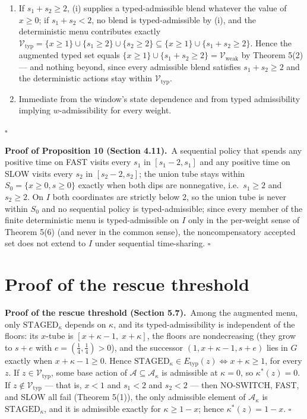 \documentclass[3p,11pt]{elsarticle}
\begin{document}
\begin{enumerate}
\def\labelenumi{(\roman{enumi})}
\setcounter{enumi}{1}
\item
  If \(s_1 + s_2 \ge 2\), (i) supplies a typed-admissible blend whatever
  the value of \(x \ge 0\); if \(s_1 + s_2 < 2\), no blend is
  typed-admissible by (i), and the deterministic menu contributes
  exactly
  \(\mathcal{V}_{\mathrm{typ}} = \{x \ge 1\} \cup \{s_1 \ge 2\} \cup \{s_2 \ge 2\} \subseteq \{x \ge 1\} \cup \{s_1 + s_2 \ge 2\}\).
  Hence the augmented typed set equals
  \(\{x \ge 1\} \cup \{s_1 + s_2 \ge 2\} = \mathcal{V}_{\mathrm{weak}}\)
  by Theorem 5(2) --- and nothing beyond, since every admissible blend
  satisfies \(s_1 + s_2 \ge 2\) and the deterministic actions stay
  within \(\mathcal{V}_{\mathrm{typ}}\).
\item
  Immediate from the window's state dependence and from typed
  admissibility implying \(w\)-admissibility for every weight.
\end{enumerate}

\ensuremath{\square}

\textbf{Proof of Proposition 10 (Section 4.11).}\ A sequential policy that spends any positive time on FAST
visits every \(s_1\) in \([s_1 - 2, s_1]\) and any positive time on SLOW
visits every \(s_2\) in \([s_2 - 2, s_2]\); the union tube stays within
\(S_0 = \{x \ge 0, s \ge 0\}\) exactly when both dips are nonnegative,
i.e.~\(s_1 \ge 2\) and \(s_2 \ge 2\). On \(I\) both coordinates are
strictly below 2, so the union tube is never within \(S_0\) and no
sequential policy is typed-admissible; since every member of the finite
deterministic menu is typed-admissible on \(I\) only in the per-weight
sense of Theorem 5(6) (and never in the common sense), the
noncompensatory accepted set does not extend to \(I\) under sequential
time-sharing. \ensuremath{\square}

\section{Proof of the rescue threshold}

\textbf{Proof of the rescue threshold (Section 5.7).}\ Among the augmented menu, only \(\mathrm{STAGED}_\kappa\) depends on \(\kappa\), and its typed-admissibility is independent of the floors: its \(x\)-tube is \([x + \kappa - 1,\; x + \kappa]\), the floors are nondecreasing (they grow to \(s + e\) with \(e = (\tfrac14, \tfrac14) > 0\)), and the successor \((1, x + \kappa - 1, s + e)\) lies in \(G\) exactly when \(x + \kappa - 1 \ge 0\). Hence \(\mathrm{STAGED}_\kappa \in E_{\mathrm{typ}}(z) \iff x + \kappa \ge 1\), for every \(z\). If \(z \in \mathcal{V}_{\mathrm{typ}}\), some base action of \(\mathcal{A} \subseteq \mathcal{A}_\kappa\) is admissible at \(\kappa = 0\), so \(\kappa^*(z) = 0\). If \(z \notin \mathcal{V}_{\mathrm{typ}}\) --- that is, \(x < 1\) and \(s_1 < 2\) and \(s_2 < 2\) --- then NO-SWITCH, FAST, and SLOW all fail (Theorem 5(1)), the only admissible element of \(\mathcal{A}_\kappa\) is \(\mathrm{STAGED}_\kappa\), and it is admissible exactly for \(\kappa \ge 1 - x\); hence \(\kappa^*(z) = 1 - x\). \ensuremath{\square}
\end{document}
